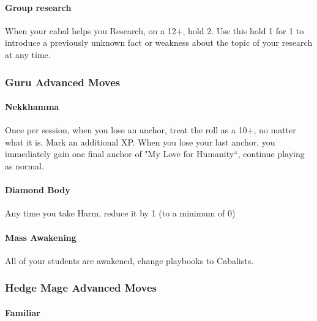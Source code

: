 \documentclass[10pt,twoside,openright]{memoir}
\begin{document}
\hypertarget{group-research}{%
\paragraph{Group research}\label{group-research}}

When your cabal helps you Research, on a 12+, hold 2. Use this hold 1
for 1 to introduce a previously unknown fact or weakness about the topic
of your research at any time.

\hypertarget{guru-advanced-moves}{%
\subsubsection{Guru Advanced Moves}\label{guru-advanced-moves}}

\hypertarget{nekkhamma}{%
\paragraph{Nekkhamma}\label{nekkhamma}}

Once per session, when you lose an anchor, treat the roll as a 10+, no
matter what it is. Mark an additional XP. When you lose your last
anchor, you immediately gain one final anchor of "My Love for
Humanity``, continue playing as normal.

\hypertarget{diamond-body}{%
\paragraph{Diamond Body}\label{diamond-body}}

Any time you take Harm, reduce it by 1 (to a minimum of 0)

\hypertarget{mass-awakening}{%
\paragraph{Mass Awakening}\label{mass-awakening}}

All of your students are awakened, change playbooks to Cabalists.

\hypertarget{hedge-mage-advanced-moves}{%
\subsubsection{Hedge Mage Advanced
Moves}\label{hedge-mage-advanced-moves}}

\hypertarget{familiar}{%
\paragraph{Familiar}\label{familiar}}
\end{document}
